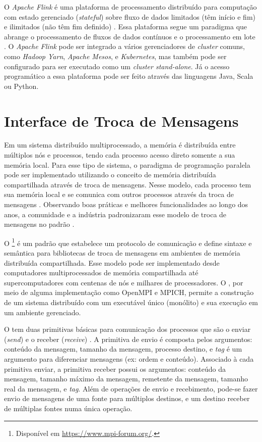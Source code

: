 O \emph{Apache Flink} é uma plataforma de processamento distribuído para
computação com estado gerenciado (\emph{stateful}) sobre fluxo de dados limitados (têm início e
fim) e ilimitados (não têm fim definido) \cite{ApacheFlink2020}.
Essa plataforma segue um paradigma que abrange o processamento de fluxos de
dados contínuos e o processamento em lote \cite{Carbone2015,Lopez2018}.
O \emph{Apache Flink} pode ser integrado a vários gerenciadores de \emph{cluster}
comuns, como \emph{Hadoop Yarn}, \emph{Apache Mesos}, e \emph{Kubernetes}, mas também pode ser
configurado para ser executado como um \emph{cluster stand-alone}.
Já o acesso programático a essa plataforma pode ser feito através das linguagens
Java, Scala ou Python.

\section{Interface de Troca de Mensagens}

Em um sistema distribuído multiprocessado, a memória é distribuída entre
múltiplos nós e processos, tendo cada processo acesso direto somente a sua memória
local.
Para esse tipo de sistema, o paradigma de programação paralela \spmd pode ser
implementado utilizando o conceito de memória distribuída compartilhada através
de troca de mensagens.
Nesse modelo, cada
processo tem sua memória local e se comunica com outros processos através da
troca de mensagens \cite{mpi-book}.
Observando boas práticas e melhores funcionalidades ao longo dos anos, a
comunidade e a indústria padronizaram esse modelo de troca de mensagens no
padrão \mpi.

O \mpi\footnote{Disponível em \url{https://www.mpi-forum.org/}.} é um padrão que
estabelece um protocolo de comunicação e define sintaxe e semântica para
bibliotecas de troca de mensagens em ambientes de memória distribuída compartilhada.
Esse modelo pode ser implementado desde computadores multiprocessados de memória
compartilhada até supercomputadores com centenas de nós e milhares de
processadores.
O \mpi, por meio de alguma
implementação como OpenMPI e MPICH, permite a construção de um sistema
distribuído com um executável único (monólito) e sua execução em um ambiente gerenciado.

O \mpi tem duas primitivas básicas para comunicação dos processos que são o
enviar (\emph{send}) e o receber (\emph{receive}) \cite{mpi-book}. A primitiva de
envio é composta pelos argumentos: conteúdo da mensagem, tamanho da mensagem,
processo destino, e \emph{tag} é um argumento para diferenciar mensagens (ex: ordem
e conteúdo).
Associado à cada primitiva enviar, a primitiva receber possui os argumentos:
conteúdo da mensagem, tamanho máximo da mensagem, remetente da mensagem, tamanho
real da mensagem, e \emph{tag}.
Além de operações de envio e recebimento, pode-se fazer
envio de mensagens de uma fonte para múltiplos destinos, e um destino receber de
múltiplas fontes numa única operação.

